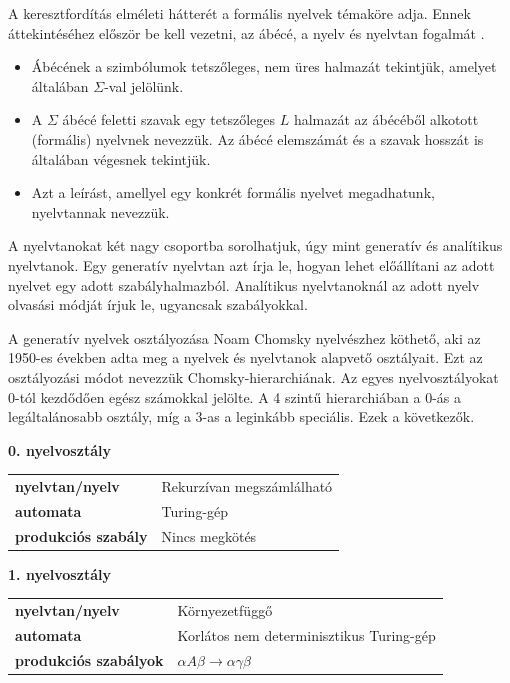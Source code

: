

A keresztfordítás elméleti hátterét a formális nyelvek témaköre adja.
Ennek áttekintéséhez először be kell vezetni, az ábécé, a nyelv és nyelvtan fogalmát \cite{formalis}.
\begin{itemize}
\item Ábécének a szimbólumok tetszőleges, nem üres halmazát tekintjük, amelyet általában $\Sigma$-val jelölünk.
\item A $\Sigma$ ábécé feletti szavak egy tetszőleges $L$ halmazát az ábécéből alkotott (formális) nyelvnek nevezzük.
Az ábécé elemszámát és a szavak hosszát is általában végesnek tekintjük.
\item Azt a leírást, amellyel egy konkrét formális nyelvet megadhatunk, nyelvtannak nevezzük.
\end{itemize}

A nyelvtanokat két nagy csoportba sorolhatjuk, úgy mint generatív és analítikus nyelvtanok.
Egy generatív nyelvtan azt írja le, hogyan lehet előállítani az adott nyelvet egy adott szabályhalmazból.
Analítikus nyelvtanoknál az adott nyelv olvasási módját írjuk le, ugyancsak szabályokkal.

A generatív nyelvek osztályozása Noam Chomsky nyelvészhez köthető, aki az 1950-es években adta meg a nyelvek és nyelvtanok alapvető osztályait. Ezt az osztályozási módot nevezzük Chomsky-hierarchiának. Az egyes nyelvosztályokat 0-tól kezdődően egész számokkal jelölte. A 4 szintű hierarchiában a 0-ás a legáltalánosabb osztály, míg a 3-as a leginkább speciális. Ezek a következők.

\bigskip

\noindent \textbf{0. nyelvosztály}

\medskip

\begin{tabular}{ll}
\textbf{nyelvtan/nyelv} & Rekurzívan megszámlálható \\
\textbf{automata} & Turing-gép \\
\textbf{produkciós szabály} & Nincs megkötés \\
\end{tabular}

\bigskip

\noindent \textbf{1. nyelvosztály}

\medskip

\begin{tabular}{ll}
\textbf{nyelvtan/nyelv} & Környezetfüggő \\
\textbf{automata} & Korlátos nem determinisztikus Turing-gép \\
\textbf{produkciós szabályok} & $\alpha A \beta \rightarrow \alpha \gamma \beta$ \\
\end{tabular}

